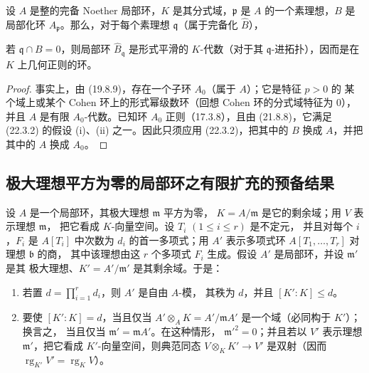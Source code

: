 \begin{corollary}[22.3.4]
\label{0.22.3.4-fr}
设 $A$ 是整的完备 Noether 局部环，$K$ 是其分式域，$\mathfrak p$ 是
$A$ 的一个素理想，$B$ 是局部化环 $A_\mathfrak p$。那么，对于每个素理想
$\mathfrak q$（属于完备化 $\widehat B$），


若 $\mathfrak q\cap B=0$，则局部环 $\widehat B_\mathfrak q$ 是形式平滑的
$K$-代数（对于其 $\mathfrak q$-进拓扑），因而是在 $K$ 上几何正则的环。
\end{corollary}

\begin{proof}
事实上，由 (19.8.9)，存在一个子环 $A_0$（属于 $A$）；它是特征 $p>0$ 的
某个域上或某个 Cohen 环上的形式幂级数环（回想 Cohen 环的分式域特征为
$0$），并且 $A$ 是有限 $A_0$-代数。已知环 $A_0$ 正则（17.3.8），且由
(21.8.8)，它满足 (22.3.2) 的假设 (i)、(ii) 之一。因此只须应用
(22.3.2)，把其中的 $B$ 换成 $A$，并把其中的 $A$ 换成 $A_0$。
\end{proof}

\subsection{极大理想平方为零的局部环之有限扩充的预备结果}
\label{subsection:0.22.4-fr}
\label{0.22.4-fr}

\begin{proposition}[22.4.1]
\label{0.22.4.1-fr}
设 $A$ 是一个局部环，其极大理想 $\mathfrak m$ 平方为零，
$K=A/\mathfrak m$ 是它的剩余域；用 $V$ 表示理想 $\mathfrak m$，
把它看成 $K$-向量空间。设 $T_i$ $(1\leqslant i\leqslant r)$ 是不定元，
并且对每个 $i$，$F_i$ 是 $A[T_i]$ 中次数为 $d_i$ 的首一多项式；用
$A'$ 表示多项式环 $A[T_1,\ldots,T_r]$ 对理想 $\mathfrak b$ 的商，
其中该理想由这 $r$ 个多项式 $F_i$ 生成。假设 $A'$ 是局部环，并设
$\mathfrak m'$ 是其
极大理想、$K'=A'/\mathfrak m'$ 是其剩余域。于是：
\begin{enumerate}
  \item[(i)] 若置 $d=\prod_{i=1}^r d_i$，则 $A'$ 是自由 $A$-模，
  其秩为 $d$，并且 $[K':K]\leqslant d$。
  \item[(ii)] 要使 $[K':K]=d$，当且仅当
  $A'\otimes_AK=A'/\mathfrak mA'$ 是一个域（必同构于 $K'$）；换言之，
  当且仅当 $\mathfrak m'=\mathfrak mA'$。在这种情形，
  $\mathfrak m'^2=0$；并且若以 $V'$ 表示理想 $\mathfrak m'$，把它看成
  $K'$-向量空间，则典范同态 $V\otimes_KK'\to V'$ 是双射（因而
  $\operatorname{rg}_{K'}V'=\operatorname{rg}_K V$）。
\end{enumerate}
\end{proposition}

